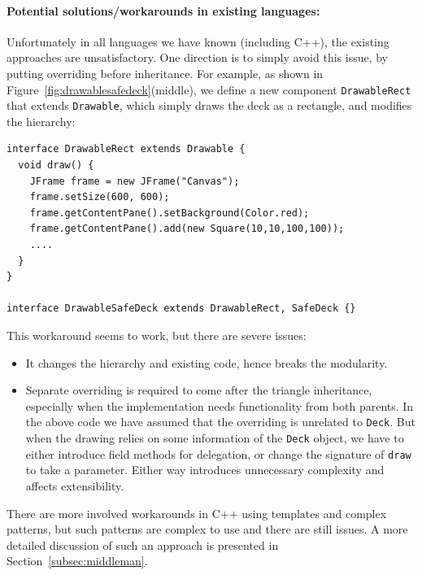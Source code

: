 \paragraph{Potential solutions/workarounds in existing languages:} Unfortunately in all languages we have known
(including C++), the existing approaches are unsatisfactory.
One direction is to simply avoid this issue, by putting overriding before inheritance. For example, as shown in Figure~\ref{fig:drawablesafedeck}(middle), we define a new component \lstinline|DrawableRect| that extends \lstinline|Drawable|, which simply draws the deck as a rectangle, and modifies the hierarchy:
\vspace{3pt}\begin{lstlisting}
interface DrawableRect extends Drawable {
  void draw() {
    JFrame frame = new JFrame("Canvas");
    frame.setSize(600, 600);
    frame.getContentPane().setBackground(Color.red);
    frame.getContentPane().add(new Square(10,10,100,100));
    ....
  }
}

interface DrawableSafeDeck extends DrawableRect, SafeDeck {}
\end{lstlisting} \vspace{3pt}
This workaround seems to work, but there are severe issues:
\begin{itemize}
	\item It changes the hierarchy and existing code, hence breaks the modularity.
	\item Separate overriding is required to come after the triangle
          inheritance, especially when the implementation needs functionality from both parents. In the above code we have assumed
	that the overriding is unrelated to \lstinline|Deck|. But when the drawing relies on some information of the \lstinline|Deck|
	object, we have to either introduce field methods for delegation, or change the signature of \lstinline|draw| to take a parameter.
	Either way introduces unnecessary complexity and affects extensibility.
\end{itemize}

There are more involved workarounds in C++ using templates and complex
patterns, but such patterns are complex to use and there are still issues. A more detailed discussion of
such an approach is presented in Section~\ref{subsec:middleman}.

